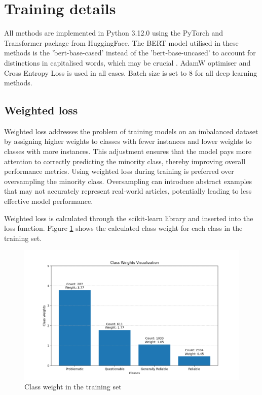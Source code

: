 \section{Training details}

All methods are implemented in Python 3.12.0 \cite{van-1995-python} using the PyTorch \cite{paszke-2017-pytorch} and Transformer \cite{wolf-2020-huggingface} package from HuggingFace. The BERT model utilised in these methods is the 'bert-base-cased' instead of the 'bert-base-uncased' to account for distinctions in capitalised words, which may be crucial \cite{devlin-2019-bert}. AdamW \cite{loshchilov-2019-adamw} optimiser and Cross Entropy Loss is used in all cases. Batch size is set to 8 for all deep learning methods.

\subsection{Weighted loss}

Weighted loss addresses the problem of training models on an imbalanced dataset by assigning higher weights to classes with fewer instances and lower weights to classes with more instances. This adjustment ensures that the model pays more attention to correctly predicting the minority class, thereby improving overall performance metrics. Using weighted loss during training is preferred over oversampling the minority class. Oversampling can introduce abstract examples that may not accurately represent real-world articles, potentially leading to less effective model performance.

Weighted loss is calculated through the scikit-learn library \cite{pedregosa-2011-scikit-learn} and inserted into the loss function. Figure \ref{fig:class_weight} shows the calculated class weight for each class in the training set.


\begin{figure}[htbp]
    \centering
    \includegraphics[width=0.9\linewidth]{figures/class_weight.png}
    \caption{Class weight in the training set}
    \label{fig:class_weight}
\end{figure}



